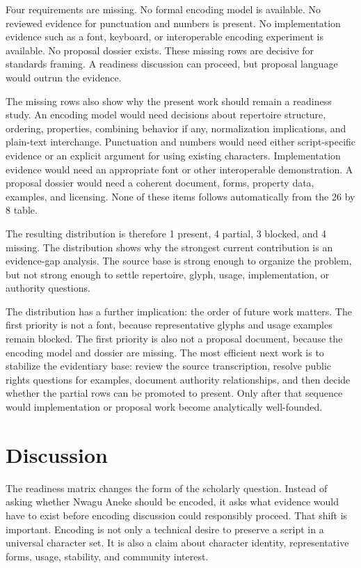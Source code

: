 \documentclass[sigconf,nonacm]{acmart}
\begin{document}
Four requirements are missing. No formal encoding model is available. No
reviewed evidence for punctuation and numbers is present. No implementation
evidence such as a font, keyboard, or interoperable encoding experiment is
available. No proposal dossier exists. These missing rows are decisive for
standards framing. A readiness discussion can proceed, but proposal language
would outrun the evidence.

The missing rows also show why the present work should remain a readiness
study. An encoding model would need decisions about repertoire structure,
ordering, properties, combining behavior if any, normalization implications, and
plain-text interchange. Punctuation and numbers would need either script-specific
evidence or an explicit argument for using existing characters. Implementation
evidence would need an appropriate font or other interoperable demonstration.
A proposal dossier would need a coherent document, forms, property data,
examples, and licensing. None of these items follows automatically from the 26
by 8 table.

The resulting distribution is therefore 1 present, 4 partial, 3 blocked, and 4
missing. The distribution shows why the strongest current contribution is an
evidence-gap analysis. The source base is strong enough to organize the problem,
but not strong enough to settle repertoire, glyph, usage, implementation, or
authority questions.

The distribution has a further implication: the order of future work matters.
The first priority is not a font, because representative glyphs and usage
examples remain blocked. The first priority is also not a proposal document,
because the encoding model and dossier are missing. The most efficient next
work is to stabilize the evidentiary base: review the source transcription,
resolve public rights questions for examples, document authority relationships,
and then decide whether the partial rows can be promoted to present. Only after
that sequence would implementation or proposal work become analytically
well-founded.

\section{Discussion}
The readiness matrix changes the form of the scholarly question. Instead of
asking whether Nwagu Aneke should be encoded, it asks what evidence would have
to exist before encoding discussion could responsibly proceed. That shift is
important. Encoding is not only a technical desire to preserve a script in a
universal character set. It is also a claim about character identity,
representative forms, usage, stability, and community interest.
\end{document}
